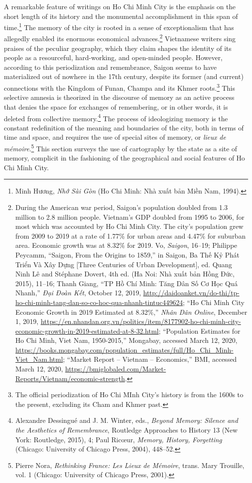 A remarkable feature of writings on Ho Chi Minh City is the emphasis on the short length of its history and the monumental accomplishment in this span of time.\footnote{\vi Minh Hương, \textit{Nhớ Sài Gòn} (Ho Chi Minh: Nhà xuất bản Miền Nam, 1994).} The memory of the city is rooted in a sense of exceptionalism that has allegedly enabled its enormous economical advances.\footnote{During the American war period, Saigon's population doubled from 1.3 million to 2.8 million people. Vietnam's GDP doubled from 1995 to 2006, for most which was accounted by Ho Chi Minh City. The city’s population grew from 2009 to 2019 at a rate of 1.77\% for urban areas and 4.47\% for suburban area. Economic growth was at 8.32\% for 2019. Vo, \textit{Saigon}, 16–19; Philippe Peycamm, “Saigon, From the Origins to 1859,” in Saigon, Ba Thế Kỷ Phát Triển Và Xây Dựng [Three Centuries of Urban Development], ed. Quang Ninh Lê and Stéphane Dovert, 4th ed. (Ha Noi: Nhà xuất bản Hồng Đức, 2015), 11–16; Thanh Giang, “TP Hồ Chí Minh: Tăng Dân Số Cơ Học Quá Nhanh,” \textit{Đại Đoàn Kết}, October 12, 2019, \url{http://daidoanket.vn/do-thi/tp-ho-chi-minh-tang-dan-so-co-hoc-qua-nhanh-tintuc449624}; “Ho Chi Minh City Economic Growth in 2019 Estimated at 8.32\%,” \textit{Nhân Dân Online}, December 1, 2019, \url{https://en.nhandan.org.vn/politics/item/8177902-ho-chi-minh-city-economic-growth-in-2019-estimated-at-8-32.html}; “Population Estimates for Ho Chi Minh, Viet Nam, 1950-2015,” Mongabay, accessed March 12, 2020, \url{https://books.mongabay.com/population_estimates/full/Ho_Chi_Minh-Viet_Nam.html}; “Market Report – Vietnam – Economics,” BMI, accessed March 12, 2020, \url{https://bmiglobaled.com/Market-Reports/Vietnam/economic-strength}.} Vietnamese writers sing praises of the peculiar geography, which they claim shapes the identity of its people as a resourceful, hard-working, and open-minded people. However, according to this periodization and remembrance, Saigon seems to have materialized out of nowhere in the 17th century, despite its former (and current) connections with the Kingdom of Funan, Champa and its Khmer roots.\footnote{The official periodization of Ho Chi MInh City's history is from the 1600s to the present, excluding its Cham and Khmer past.} This selective amnesia is theorized in the discourse of memory as an active process that denies the space for exchanges of remembering, or in other words, it is deleted from collective memory.\footnote{Alexandre Dessingué and J. M. Winter, eds., \textit{Beyond Memory: Silence and the Aesthetics of Remembrance}, Routledge Approaches to History 13 (New York: Routledge, 2015), 4; Paul Ricœur, \textit{Memory, History, Forgetting} (Chicago: University of Chicago Press, 2004), 448–52.} The process of ideologizing memory is the constant redefinition of the meaning and boundaries of the city, both in terms of time and space, and requires the use of special sites of memory, or \textit{lieux de mémoire}.\footnote{Pierre Nora, \textit{Rethinking France: Les Lieux de Mémoire}, trans. Mary Trouille, vol. 1 (Chicago: University of Chicago Press, 2001).} This section surveys the use of cartography by the state as a site of memory, complicit in the fashioning of the geographical and social features of Ho Chi Minh City.

